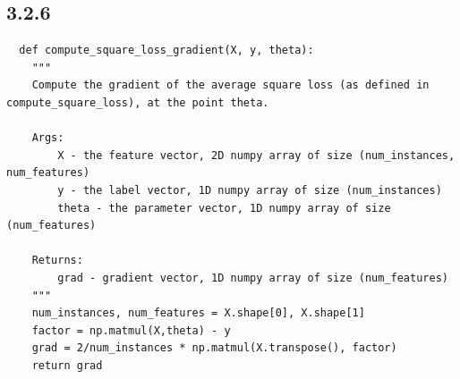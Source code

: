 \documentclass{article}
\begin{document}
\subsection{3.2.6}
\begin{verbatim}
  def compute_square_loss_gradient(X, y, theta):
    """
    Compute the gradient of the average square loss (as defined in compute_square_loss), at the point theta.

    Args:
        X - the feature vector, 2D numpy array of size (num_instances, num_features)
        y - the label vector, 1D numpy array of size (num_instances)
        theta - the parameter vector, 1D numpy array of size (num_features)

    Returns:
        grad - gradient vector, 1D numpy array of size (num_features)
    """
    num_instances, num_features = X.shape[0], X.shape[1]
    factor = np.matmul(X,theta) - y
    grad = 2/num_instances * np.matmul(X.transpose(), factor)
    return grad                 
\end{verbatim}
\endsubsection
\end{document}
